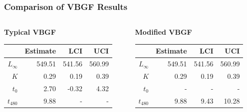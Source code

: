 \documentclass[xcolor=dvipsnames,t]{beamer}\usepackage[]{graphicx}\usepackage[]{color}
\begin{document}
\begin{frame}[fragile]
\frametitle{Comparison of VBGF Results}
\begin{columns}
\begin{column}{0.5\textwidth}
\textbf{Typical VBGF}
\begin{table}[ht]
\centering
\begin{tabular}{rrrr}
  \hline
 & Estimate & LCI & UCI \\ 
  \hline
$L_{\infty}$ & 549.51 & 541.56 & 560.99 \\ 
  $K$ & 0.29 & 0.19 & 0.39 \\ 
  $t_{0}$ & 2.70 & -0.32 & 4.32 \\ 
  $t_{480}$ & 9.88 & - & - \\ 
   \hline
\end{tabular}
\end{table}

\end{column}
\begin{column}{0.5\textwidth}
\textbf{Modified VBGF}
\begin{table}[ht]
\centering
\begin{tabular}{rrrr}
  \hline
 & Estimate & LCI & UCI \\ 
  \hline
$L_{\infty}$ & 549.51 & 541.56 & 560.99 \\ 
  $K$ & 0.29 & 0.19 & 0.39 \\ 
  $t_{0}$ & - & - & - \\ 
  $t_{480}$ & 9.88 & 9.43 & 10.28 \\ 
   \hline
\end{tabular}
\end{table}

\end{column}
\end{columns}
\end{frame}
\end{document}
